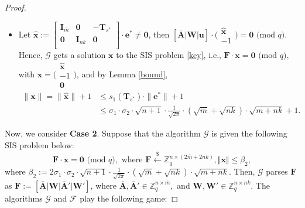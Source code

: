 \documentclass[a4paper,11pt,onecolumn]{elsarticle}
\def\bf{\mathbf}
\begin{document}
\begin{proof}
\begin{itemize}
	
\item 
		Let $\widehat{\mathbf{x}}:=\begin{bmatrix}
			\mathbf{I}_{\overline{m}} & \textbf{0} &-\mathbf{T}_{s^*} \\
			\textbf{0}&\textbf{I}_{nk}& \textbf{0}\\
			\end{bmatrix} \cdot \bf{e}^* \neq \textbf{0}$,  then $[\overline{\textbf{A}}|\textbf{W}|\textbf{u}]\cdot  \bigl( \begin{smallmatrix}
				   \widehat{\mathbf{x}}\\ -1
				 \end{smallmatrix} \bigr)=\bf{0}\text{ (mod } q)$.
	Hence, $\mathcal{G}$ gets a solution $\mathbf{x}$ to the SIS problem \eqref{key}, i.e.,  $\mathbf{F}\cdot \mathbf{x}=\bf{0}\text{ (mod } q),$ with $\mathbf{x}= \bigl( \begin{smallmatrix}
	   \widehat{\mathbf{x}}\\ -1\\\mathbf{0}
	 \end{smallmatrix} \bigr)$, and by Lemma \ref{bound},
	\begin{align*}
	\| \mathbf{x}\|=\| \widehat{\mathbf{x}}\| +1	&\leq  s_1(\mathbf{T}_{s^*}) \cdot \| \mathbf{e}^*\|+1\\
	&	\leq \sigma_1\cdot \sigma_2\cdot \sqrt{n+1} \cdot \frac{1}{\sqrt{2\pi}}\cdot (\sqrt{\overline{m}}+\sqrt{nk}) \cdot\sqrt{m+nk}+1.
	\end{align*}
	
	

	\end{itemize}
	
	
Now, we consider \textbf{Case 2}.  Suppose that the algorithm  $\mathcal{G}$ is given the following SIS problem below:
			\begin{equation}\label{key2}
			\bf{F}\cdot \bf{x}=\bf{0} \text{ (mod } q), \text{ where } \bf{F} \xleftarrow{\$} \mathbb{Z}_q^{n \times (2\overline{m}+2nk)}, \Vert \textbf{x}\Vert \leq \beta_2,
			\end{equation}
	where $ \beta_2:=  2\sigma_1\cdot \sigma_2\cdot \sqrt{n+1} \cdot \frac{1}{\sqrt{2\pi}}\cdot (\sqrt{\overline{m}}+\sqrt{nk}) \cdot\sqrt{m+nk}  $. 	Then, $\mathcal{G}$ parses $\bf{F}$ as $\bf{F}:=[\overline{\bf{A}}|\bf{W}|\overline{\bf{A}}'|\bf{W'}]$, where $\overline{\bf{A}},\overline{\bf{A}}' \in \mathbb{Z}_q^{n \times \overline{m}},$  and $ \mathbf{W}, \bf{W}'\in \mathbb{Z}_q^{n \times nk}$. 
			The algorithms  $\mathcal{G}$ and $\mathcal{F}$ play the following game:
			

\end{proof}
\end{document}
